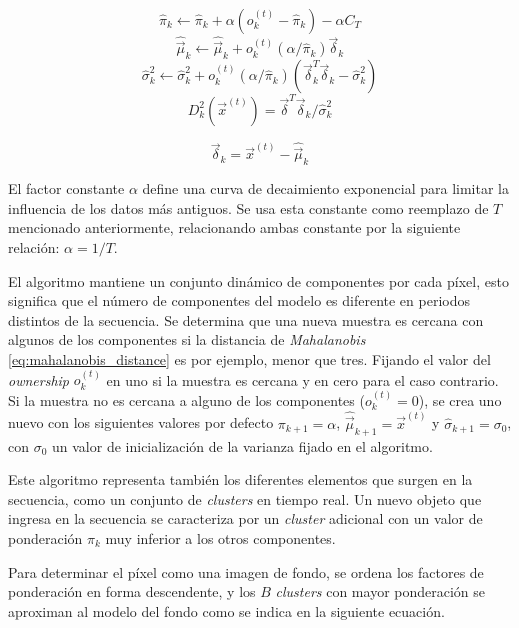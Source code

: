 \begin{equation} \label{eq:mixturefactor_update}
\hat{\pi}_k \leftarrow  \hat{\pi}_k + \alpha(o^{(t)}_k - \hat{\pi}_k) - \alpha C_T
\end{equation}
\begin{equation} \label{eq:mixturemu_update}
\hat{\vec{\mu}}_k \leftarrow \hat{\vec{\mu}}_k + o^{(t)}_k (\alpha/\hat{\pi}_k) \vec{\delta}_k
\end{equation}
\begin{equation} \label{eq:mixturesigma_update}
\hat{\sigma}^2_k \leftarrow \hat{\sigma}^2_k + o^{(t)}_k (\alpha/\hat{\pi}_k) (\vec{\delta}^T_k \vec{\delta}_k - \hat{\sigma}^2_k)
\end{equation}
\begin{equation} \label{eq:mahalanobis_distance}
D^{2}_{k}(\vec{x}^{(t)})=\vec{\delta}^T\vec{\delta}_k/\hat{\sigma}^{2}_k
\end{equation}

\[
\vec{\delta}_k = \vec{x}^{(t)} - \hat{\vec{\mu}}_k
\]


El factor constante $\alpha$ define una curva de decaimiento exponencial para limitar la influencia de los datos más antiguos. Se usa esta constante como reemplazo de $T$ mencionado anteriormente, relacionando ambas constante por la siguiente relación: $\alpha=1/T$. 

El algoritmo mantiene un conjunto dinámico de componentes por cada píxel, esto significa que el número de componentes del modelo es diferente en periodos distintos de la secuencia. Se determina que una nueva muestra es cercana con algunos de los componentes si la distancia de \textit{Mahalanobis} \eqref{eq:mahalanobis_distance} es por ejemplo, menor que tres. Fijando el valor del \textit{ownership} $o^{(t)}_k$ en uno si la muestra es cercana y en cero para el caso contrario. Si la muestra no es cercana a alguno de los componentes ($o^{(t)}_k=0$), se crea uno nuevo con los siguientes valores por defecto $\pi_{k+1} = \alpha$, $\hat{\vec{\mu}}_{k+1}=\vec{x}^{(t)}$ y $\hat{\sigma}_{k+1}=\sigma_0$, con $\sigma_0$ un valor de inicialización de la varianza fijado en el algoritmo.

Este algoritmo representa también los diferentes elementos que surgen en la secuencia, como un conjunto de \textit{clusters} en tiempo real. Un nuevo objeto que ingresa en la secuencia se caracteriza por un \textit{cluster} adicional con un valor de ponderación $\pi_k$ muy inferior a los otros componentes. 

Para determinar el píxel como una imagen de fondo, se ordena los factores de ponderación en forma descendente, y los $B$ \textit{clusters} con mayor ponderación se aproximan al modelo del fondo como se indica en la siguiente ecuación.

